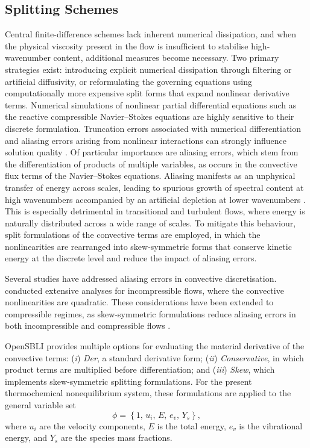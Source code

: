 \subsection{Splitting Schemes}


Central finite-difference schemes lack inherent numerical dissipation, and when the physical viscosity present in the flow is insufficient to stabilise high-wavenumber content, additional measures become necessary. Two primary strategies exist: introducing explicit numerical dissipation through filtering or artificial diffusivity, or reformulating the governing equations using computationally more expensive split forms that expand nonlinear derivative terms. Numerical simulations of nonlinear partial differential equations such as the reactive compressible Navier--Stokes equations are highly sensitive to their discrete formulation. Truncation errors associated with numerical differentiation and aliasing errors arising from nonlinear interactions can strongly influence solution quality \citep{Boyd2001}. Of particular importance are aliasing errors, which stem from the differentiation of products of multiple variables, as occurs in the convective flux terms of the Navier--Stokes equations. Aliasing manifests as an unphysical transfer of energy across scales, leading to spurious growth of spectral content at high wavenumbers accompanied by an artificial depletion at lower wavenumbers \citep{KennedyGruber2008}. This is especially detrimental in transitional and turbulent flows, where energy is naturally distributed across a wide range of scales. To mitigate this behaviour, split formulations of the convective terms are employed, in which the nonlinearities are rearranged into skew-symmetric forms that conserve kinetic energy at the discrete level and reduce the impact of aliasing errors.

Several studies have addressed aliasing errors in convective discretisation.\cite{Zang1991} conducted extensive analyses for incompressible flows, where the convective nonlinearities are quadratic. These considerations have been extended to compressible regimes, as skew-symmetric formulations reduce aliasing errors in both incompressible and compressible flows \citep{Boyd2001}.

OpenSBLI provides multiple options for evaluating the material derivative of the convective terms: (\textit{i}) \textit{Der}, a standard derivative form; (\textit{ii}) \textit{Conservative}, in which product terms are multiplied before differentiation; and (\textit{iii}) \textit{Skew}, which implements skew-symmetric splitting formulations. For the present thermochemical nonequilibrium system, these formulations are applied to the general variable set
\begin{equation}
    \phi = \left\{ 1, \, u_i, \, E, \, e_v, \, Y_s \right\},
\end{equation}
where $u_i$ are the velocity components, $E$ is the total energy, $e_v$ is the vibrational energy, and $Y_s$ are the species mass fractions.

